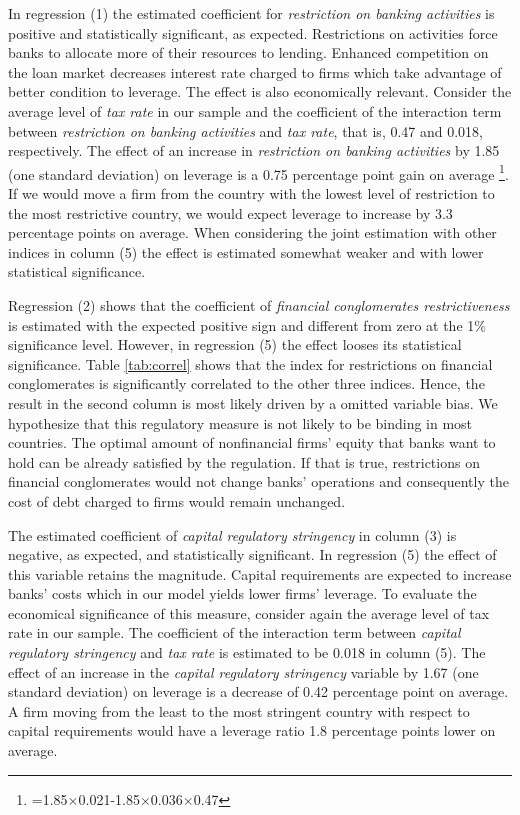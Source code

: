 \documentclass[12pt]{article}
\begin{document}
	  In regression (1) the estimated coefficient for \textit{restriction on banking activities}  is positive and statistically significant, as expected. Restrictions on activities force banks to allocate more of their resources to lending. Enhanced competition on the loan market decreases interest rate charged to firms which take advantage of better condition to leverage. The effect is also economically relevant. Consider the average level of \textit{tax rate} in our sample and the coefficient of the interaction term between \textit{restriction on banking activities} and \textit{tax rate}, that is, 0.47 and 0.018, respectively. The effect of an increase in \textit{restriction on banking activities} by 1.85 (one standard deviation) on leverage is a 0.75 percentage point gain on average \footnote{=1.85$\times$0.021-1.85$\times$0.036$\times$0.47}. If we would move a firm from the country with the lowest level of restriction to the most restrictive country, we would expect leverage to increase by 3.3 percentage points on average.  When considering the joint estimation with other indices in column (5) the effect is estimated somewhat weaker and with lower statistical significance.
	
	  Regression (2) shows that the coefficient of \textit{financial conglomerates restrictiveness} is estimated with the expected positive sign and different from zero at the 1\% significance level. However, in regression (5) the effect looses its statistical significance. Table \ref{tab:correl} shows that the index for restrictions on financial conglomerates is significantly correlated to the other three indices. Hence, the result in the second column is most likely driven by a omitted variable bias. We hypothesize that this regulatory measure is not likely to be binding in most countries. The optimal amount of nonfinancial firms' equity that banks want to hold can be already satisfied by the regulation. If that is true, restrictions on financial conglomerates would not change banks' operations and consequently the cost of debt charged to firms would remain unchanged.
	
	  The estimated coefficient of \textit{capital regulatory stringency} in column (3) is negative, as expected, and statistically significant. In regression (5) the effect of this variable retains the magnitude. Capital requirements are expected to increase banks' costs which in our model yields lower firms' leverage. To evaluate the economical significance of this measure, consider again the average level of tax rate in our sample. The coefficient of the interaction term between \textit{capital regulatory stringency} and \textit{tax rate} is estimated to be 0.018 in column (5). The effect of an increase in the \textit{capital regulatory stringency} variable by 1.67 (one standard deviation) on leverage is a decrease of 0.42 percentage point on average. A firm moving from the least to the most stringent country with respect to capital requirements would have a leverage ratio 1.8 percentage points lower on average.
	
\end{document}
